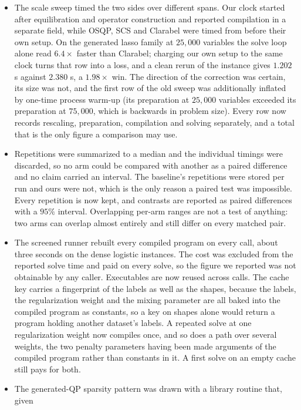 \begin{itemize}
  downgraded numpy and scipy and broke JAX; baselines now live in isolated
  environments.
\item The scale sweep timed the two sides over different spans. Our clock started
  after equilibration and operator construction and reported compilation in a
  separate field, while OSQP, SCS and Clarabel were timed from before their own
  setup. On the generated lasso family at $25{,}000$ variables the solve loop alone
  read $6.4\times$ faster than Clarabel; charging our own setup to the same clock
  turns that row into a loss, and a clean rerun of the instance gives
  $1.202$ s against $2.380$ s, a $1.98\times$ win. The direction of the correction was
  certain, its size was not, and the first row of the old sweep was additionally
  inflated by one-time process warm-up (its preparation at $25{,}000$ variables
  exceeded its preparation at $75{,}000$, which is backwards in problem size). Every
  row now records rescaling, preparation, compilation and solving separately, and a
  total that is the only figure a comparison may use.
\item Repetitions were summarized to a median and the individual timings were
  discarded, so no arm could be compared with another as a paired difference and no
  claim carried an interval. The baseline's repetitions were stored per run and ours
  were not, which is the only reason a paired test was impossible. Every repetition
  is now kept, and contrasts are reported as paired differences with a $95\%$
  interval. Overlapping per-arm ranges are not a test of anything: two arms can
  overlap almost entirely and still differ on every matched pair.
\item The screened runner rebuilt every compiled program on every call, about three
  seconds on the dense logistic instances. The cost was excluded from the reported
  solve time and paid on every solve, so the figure we reported was not obtainable by
  any caller. Executables are now reused across calls. The cache key carries a
  fingerprint of the labels as well as the shapes, because the labels, the
  regularization weight and the mixing parameter are all baked into the compiled
  program as constants, so a key on shapes alone would return a program holding
  another dataset's labels. A repeated solve at one regularization weight now
  compiles once, and so does a path over several weights, the two penalty parameters
  having been made arguments of the compiled program rather than constants in it. A
  first solve on an empty cache still pays for both.
\item The generated-QP sparsity pattern was drawn with a library routine that, given

\end{itemize}
